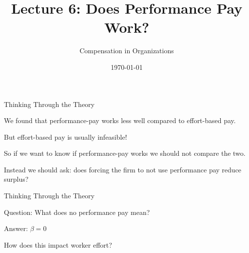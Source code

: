 \documentclass[aspectratio=169,usenames,dvipsnames]{beamer}
\title[diss]{Lecture 6: Does Performance Pay Work?} %
\author{Compensation in Organizations} %
\institute[shortinst]{Jacob Kohlhepp}
\date{\today} %
\newenvironment{wideitemize}{\itemize\addtolength{\itemsep}{10pt}}{\enditemize}
\begin{document}
\begin{frame}
\titlepage %

\end{frame}


\begin{frame}{Thinking Through the Theory}
\begin{wideitemize}
    \item We found that performance-pay works less well compared to effort-based pay.
    \item But effort-based pay is usually infeasible!
    \item So if we want to know if performance-pay works we should not compare the two.
    \item Instead we should ask: does forcing the firm to not use performance pay reduce surplus?
\end{wideitemize}
    
\end{frame}

\begin{frame}{Thinking Through the Theory}
\begin{wideitemize}
    \item Question: What does no performance pay mean?

    \pause
    \begin{wideitemize}
        \item Answer: $\beta=0$
    \end{wideitemize}
    \pause
    \item How does this impact worker effort?
\end{wideitemize}
    
\end{frame}
\end{document}
